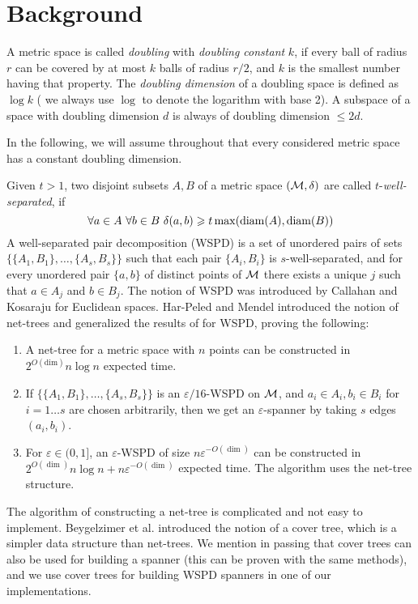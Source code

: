 \documentclass[]{ws-ijcga}
\renewcommand{\leq}{\leqslant}
\renewcommand{\geq}{\geqslant}
\newcommand{\eps}{\varepsilon}
\begin{document}
\section{Background}
\label{sec:back}
%
A metric space is called \textit{doubling} with \textit{doubling constant} $k$,
if every ball of radius $r$ can be covered by at most $k$ balls of radius $r/2$,
and $k$ is the smallest number having that property.
The \textit{doubling dimension} of a doubling space is defined as $\log k$
(%
we always use $\log$ to denote the logarithm with base 2).
A subspace of a space with doubling dimension $d$ 
is always of doubling dimension $\leq 2d$.

In the following, we will assume throughout that every considered metric space
has a constant doubling dimension.

Given $t > 1$, two disjoint subsets $A, B$ of a metric space $(\mathcal{M}, \delta)$ are called $t$-\textit{well-separated},
if 
\[
\forall a \in A \,\, \forall b \in B \,\, \dist(a, b) \geq t \max(\diam(A), \diam(B))
\]
A well-separated pair decomposition (WSPD) is a set of unordered pairs of sets $\{ \{A_1, B_1 \}, 
\dots, \{A_s, B_s\} \}$ such that each pair $\{A_i, B_i\}$ is $s$-well-separated, and for every unordered pair $\{a, b\}$ 
of distinct points of $\mathcal{M}$ there exists a unique $j$ such that $a \in A_j$ and $b \in B_j$.
The notion of WSPD was introduced by Callahan and Kosaraju \cite{cal-kos-wspd} for Euclidean spaces.
Har-Peled and Mendel \cite{hm-fast} 
introduced the notion of net-trees and
generalized the results of \cite{cal-kos-wspd} for WSPD, proving the following:
\begin{enumerate}
    \item A net-tree for a metric space with $n$ points can be constructed in $2^{O(\mbox{dim})} n \log n$ expected time.
    \item If $\{ \{A_1, B_1 \}, 
\dots, \{A_s, B_s\} \}$ is an $\eps / 16$-WSPD on $\mathcal{M}$, and $a_i \in A_i, b_i \in B_i$ for $i = 1\dots s$
are chosen arbitrarily, then we get an $\eps$-spanner by taking $s$ edges $(a_i, b_i)$.
    \item For $\eps \in (0, 1]$,  an $\eps$-WSPD of size $n \eps^{-O({\dim})}$ can be constructed in $2^{O({\dim})} n \log n + n \eps ^{-O({\dim})}$ expected time. The algorithm uses the net-tree structure.
\end{enumerate}
The algorithm of constructing a net-tree is complicated and not easy to implement. Beygelzimer
et al. \cite{cover-trees} introduced the notion of a cover tree, which is a simpler data structure 
than net-trees. We mention in passing that cover trees can also be used for building
a spanner (this can be proven with the same methods), and we use cover trees for
building WSPD spanners in one of our implementations.
\end{document}
